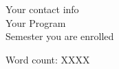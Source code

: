 \begin{titlepage}
    \vfill %
    
    Your contact info \\ %
    Your Program \\ %
    Semester you are enrolled \\ %
    
    \vfill %
    
    
    \vfill %
        
    Word count: XXXX %
        
    
        
    \end{titlepage}